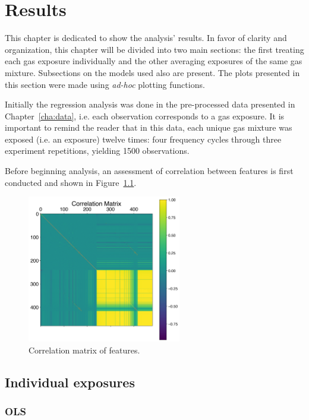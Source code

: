\chapter{Results}
\label{cha:results}

This chapter is dedicated to show the analysis' results. In favor of clarity and organization, this chapter will be divided into two main sections: the first treating each gas exposure individually and the other averaging exposures of the same gas mixture. Subsections on the models used also are present. The plots presented in this section were made using \textit{ad-hoc} plotting functions.

Initially the regression analysis was done in the pre-processed data presented in Chapter~\ref{cha:data}, i.e. each observation corresponds to a gas exposure. It is important to remind the reader that in this data, each unique gas mixture was exposed (i.e. an exposure) twelve times: four frequency cycles through three experiment repetitions, yielding 1500 observations. 

Before beginning analysis, an assessment of correlation between features is first conducted and shown in Figure~\ref{fig:cor-mat}.

\begin{figure}[h]
	\centering
	\includegraphics[width=0.6\textwidth]{../figures/correlation-matrix.png}
	\caption{Correlation matrix of features.}
	\label{fig:cor-mat}
\end{figure}

\section{Individual exposures}

\subsection{OLS}

